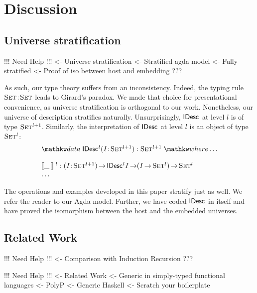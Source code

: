\section{Discussion}
\label{sec:discussion}

\subsection{Universe stratification}

\begin{wstructure}
!!! Need Help !!!
<- Universe stratification
    <- Stratified agda model
        <- Fully stratified
        <- Proof of iso between host and embedding
    ???
\end{wstructure}

As such, our type theory suffers from an inconsistency. Indeed, the
typing rule $\Bhab{\Set}{\Set}$ leads to Girard's paradox. We made
that choice for presentational convenience, as universe stratification
is orthogonal to our work. Nonetheless, our universe of description
stratifies naturally. Unsurprisingly, $\IDesc{\!}$ at level $l$ is of
type $\Set^{\blue{l+1}}$. Similarly, the interpretation of
$\IDesc{\!}$ at level $l$ is an object of type $\Set^{\blue{l}}$:
%
\[\stk{
\data \IDesc{\!}^{\blue{l}} (\Bhab{\V{I}}{\Set^{\blue{l+1}}}) : \Set^{\blue{l+1}} \where \ldots \\
\\
\idescop{\_\:}{}{}^{\blue{l}} : \PI{\V{I}}{\Set^{\blue{l+1}}} \IDesc{{\!}^{\blue{l}}\V{I}} \To (\V{I} \To \Set^{\blue{l}}) \To \Set^{\blue{l}}    \\
\ldots
}\]

The operations and examples developed in this paper stratify just as
well. We refer the reader to our Agda model. Further, we have coded
$\IDesc{\!}$ in itself and have proved the isomorphism between the
host and the embedded universes.

\subsection{Related Work}

\begin{wstructure}
!!! Need Help !!!
<- Comparison with Induction Recursion
    ???
\end{wstructure}


\begin{wstructure}
!!! Need Help !!!
<- Related Work
    <- Generic in simply-typed functional languages
        <- PolyP \cite{jansson:polyp}
        <- Generic Haskell \cite{hinze:generic-haskell}
        <- Scratch your boilerplate \cite{spj:syb}
\end{wstructure}

